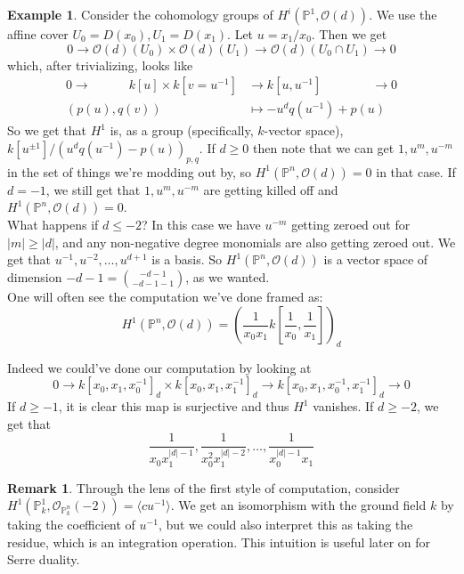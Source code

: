 \documentclass[10pt,reqno]{amsart}
\theoremstyle{definition}
\newtheorem{example}[theorem]{Example}
\newtheorem{remark}[theorem]{Remark}
\theoremstyle{remark}
\numberwithin{equation}{section}
\numberwithin{theorem}{section}
\newcommand*{\red}{\textcolor{red}}
\newcommand{\OO}{{\mathcal O}}
\newcommand{\PP}{{\mathbb P}}
\begin{document}
\begin{example} Consider the cohomology groups of $H^i(\PP^1,\OO(d))$. We use the affine cover $U_0 = D(x_0), U_1 = D(x_1)$. Let $u = x_1/x_0$. Then we get
\[0 \to \OO(d)(U_0) \times \OO(d)(U_1) \to \OO(d)(U_0 \cap U_1) \to 0\]
which, after trivializing, looks like
\begin{align*}
0 \longrightarrow \quad \quad \quad k[u] \times k[v = u^{-1}] &\to k[u,u^{-1}] \quad \quad \quad \quad \longrightarrow 0 \\
  (p(u), q(v)) &\mapsto -u^d q(u^{-1}) + p(u) 
\end{align*}
So we get that $H^1$ is, as a group (specifically, $k$-vector space), $k[u^{\pm 1}]/(u^dq(u^{-1}) - p(u))_{p,q}$. If $d \ge 0$ then note that we can get $1,u^m,u^{-m}$ in the set of things we're modding out by, so $H^1(\PP^n,\OO(d)) = 0$ in that case. If $d=-1$, we still get that $1,u^m,u^{-m}$ are getting killed off and $H^1(\PP^n,\OO(d)) = 0$.
\\

What happens if $d \le -2$? In this case we have $u^{-m}$ getting zeroed out for $|m| \ge |d|$, and any non-negative degree monomials are also getting zeroed out. We get that $u^{-1},u^{-2},\dots,u^{d+1}$ is a basis. So $H^1(\PP^n,\OO(d))$ is a vector space of dimension $-d-1 = \binom{-d-1}{-d-1-1}$, as we wanted. 
\\

One will often see the computation we've done framed as:
\[H^1(\PP^n,\OO(d)) = \left(\frac{1}{x_0x_1} k\left[\frac{1}{x_0},\frac{1}{x_1}\right]\right)_d\]

Indeed we could've done our computation by looking at
\[0 \to k[x_0,x_1,x_0^{-1}]_{d} \times k[x_0,x_1,x_1^{-1}]_d \to k[x_0,x_1,x_0^{-1},x_1^{-1}]_d \to 0 \]
If $d \ge -1$, it is clear this map is surjective and thus $H^1$ vanishes. If $d \ge -2$, we get that
\[\frac{1}{x_0x_1^{|d|-1}}, \frac{1}{x_0^2 x_1^{|d|-2}}, \dots, \frac{1}{x_0^{|d|-1}x_1} \]
\end{example}

\begin{remark} Through the lens of the first style of computation, consider $H^1(\PP^1_k,\OO_{\PP^n_k}(-2)) = \langle c u^{-1}\rangle$. We get an isomorphism with the ground field $k$ by taking the coefficient of $u^{-1}$, but we could also interpret this as taking the residue, which is an integration operation. This intuition is useful later on for Serre duality.
\end{remark}
\end{document}
